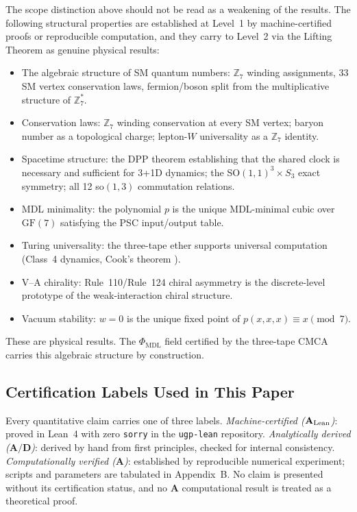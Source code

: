\documentclass[11pt]{article}
\theoremstyle{remark}
\newcommand{\PHIMDL}{\Phi_{\mathrm{MDL}}}
\newcommand{\ZS}{\mathbb{Z}_7}
\newcommand{\CatA}{\textbf{A}}
\newcommand{\CatAL}{\ensuremath{\textbf{A}_{\rm Lean}}}
\newcommand{\CatAD}{\textbf{A/D}}
\newcommand{\CMCA}{\text{CMCA}}
\newcommand{\FF}{\mathrm{GF}}
\begin{document}
The scope distinction above should not be read as a weakening of the
results. The following structural properties are established at Level~1 by
machine-certified proofs or reproducible computation, and they carry to
Level~2 via the Lifting Theorem as genuine physical results:

\begin{itemize}
  \item The algebraic structure of SM quantum numbers: $\ZS$ winding
        assignments, 33 SM vertex conservation laws, fermion/boson split
        from the multiplicative structure of $\ZS^*$.
  \item Conservation laws: $\ZS$ winding conservation at every SM vertex;
        baryon number as a topological charge; lepton-$W$ universality as a
        $\ZS$ identity.
  \item Spacetime structure: the DPP theorem establishing that the shared
        clock is necessary and sufficient for 3+1D dynamics; the
        SO$(1,1)^3 \times S_3$ exact symmetry; all 12 so$(1,3)$
        commutation relations.
  \item MDL minimality: the polynomial $p$ is the unique MDL-minimal cubic
        over $\FF(7)$ satisfying the PSC input/output table.
  \item Turing universality: the three-tape ether supports universal
        computation (Class~4 dynamics, Cook's theorem \cite{Cook2004}).
  \item V--A chirality: Rule~110/Rule~124 chiral asymmetry is the
        discrete-level prototype of the weak-interaction chiral structure.
  \item Vacuum stability: $w = 0$ is the unique fixed point of
        $p(x,x,x) \equiv x \pmod{7}$.
\end{itemize}

These are physical results. The $\PHIMDL$ field certified by the three-tape
$\CMCA$ carries this algebraic structure by construction.

\subsection{Certification Labels Used in This Paper}

Every quantitative claim carries one of three labels. \emph{Machine-certified
($\CatAL$)}: proved in Lean~4 with zero \texttt{sorry} in the \texttt{ugp-lean}
repository. \emph{Analytically derived ($\CatAD$)}: derived by hand from
first principles, checked for internal consistency. \emph{Computationally
verified ($\CatA$)}: established by reproducible numerical experiment; scripts
and parameters are tabulated in Appendix~B. No claim is presented without its
certification status, and no $\CatA$ computational result is treated as a
theoretical proof.
\end{document}
